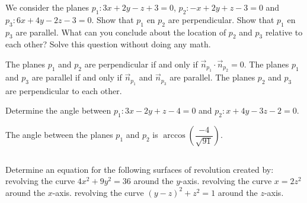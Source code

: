 \ifanalysis\begin{Exercise}[difficulty = 1]\fi\ifcalculus\begin{Exercise}[difficulty = 2]\fi We consider the planes $p_1: 3x+2y-z+3=0$,  $p_2: -x+2y+z-3=0$ and \\ $p_3: 6x+4y-2z-3=0$.
		\Question Show that  $p_1$ en $p_2$ are perpendicular.
		\Question Show that  $p_1$ en $p_3$ are parallel.
		\Question What can you  conclude about the location of $p_2$ and $p_3$ relative to each other? Solve this question without doing any math.

\ifanalysis\end{Exercise}\fi\ifcalculus\end{Exercise}\fi

\begin{Answer}\phantom{}
   
		\Question The planes $p_1$ and $p_2$ are perpendicular if and only if $\vec n_{p_1} \cdot \vec n_{p_2} = 0$.
		\Question The planes $p_1$ and $p_3$ are parallel if and only if $\vec n_{p_1} $ and $\vec n_{p_3}$ are parallel.
		\Question The planes $p_2$ and $p_3$ are perpendicular to each other.
\end{Answer}
	
\ifanalysis\begin{Exercise}[difficulty = 1]\fi\ifcalculus\begin{Exercise}[difficulty = 2]\fi 
Determine the angle between  $p_1 : 3x-2y+z-4=0$ and $p_2: x+4y-3z-2=0$.

\ifanalysis\end{Exercise}\fi\ifcalculus\end{Exercise}\fi

\begin{Answer}\phantom{}
    The angle between the planes $p_1$ and $p_2$ is $\arccos \left( \dfrac{-4}{\sqrt{91}} \right)$.
\end{Answer}	

\pagebreak

\subsection*{}

\ifanalysis
	\begin{Exercise} Determine an equation for the following surfaces of revolution created by: 
		\Question[difficulty = 1] revolving the curve $4x^2 + 9y^2 = 36$ around the $y$-axis.
		\Question[difficulty = 1] revolving the curve $x=2z^2$ around the $x$-axis.
		\Question[difficulty = 2] revolving the curve $(y-z)^2 + z^2 = 1$ around the $z$-axis.
	
	\end{Exercise}
	
